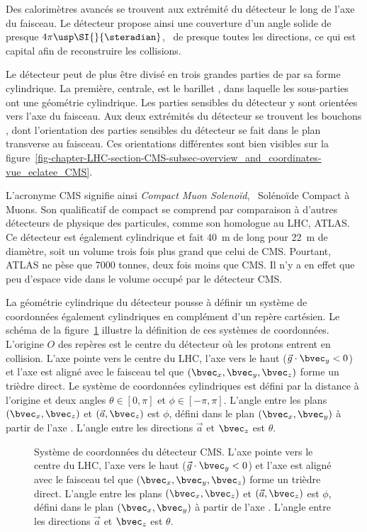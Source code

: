 Des calorimètres avancés se trouvent aux extrémité du détecteur le long de l'axe du faisceau.
Le détecteur propose ainsi une couverture d'un angle solide de presque $4\pi\usp\SI{}{\steradian}$, \ie\ de presque toutes les directions, ce qui est capital afin de reconstruire les collisions.
\par Le détecteur peut de plus être divisé en trois grandes parties de par sa forme cylindrique.
La première, centrale, est le \og barillet \fg, dans laquelle les sous-parties ont une géométrie cylindrique.
Les parties sensibles du détecteur y sont orientées vers l'axe du faisceau.
Aux deux extrémités du détecteur se trouvent les \og bouchons \fg, dont l'orientation des parties sensibles du détecteur se fait dans le plan transverse au faisceau.
Ces orientations différentes sont bien visibles sur la figure~\ref{fig-chapter-LHC-section-CMS-subsec-overview_and_coordinates-vue_eclatee_CMS}.
\par L'acronyme CMS signifie ainsi \emph{Compact Muon Solenoïd}, \ie\ Solénoïde Compact à Muons.
Son qualificatif de \og compact \fg{} se comprend par comparaison à d'autres détecteurs de physique des particules, comme son homologue au LHC, ATLAS.
Ce détecteur est également cylindrique et fait \SI{40}{\meter} de long pour \SI{22}{\meter} de diamètre, soit un volume trois fois plus grand que celui de CMS.
Pourtant, ATLAS ne pèse \og que \fg{} \num{7000} tonnes, deux fois moins que CMS.
Il n'y a en effet que peu d'espace vide dans le volume occupé par le détecteur CMS.
\par La géométrie cylindrique du détecteur pousse à définir un système de coordonnées également cylindriques en complément d'un repère cartésien.
Le schéma de la figure~\ref{fig-chapter-LHC-section-CMS-subsec-overview_and_coordinates-CMS_3D_phi_theta_defs} illustre la définition de ces systèmes de coordonnées.
L'origine $O$ des repères est le centre du détecteur où les protons entrent en collision.
L'axe  pointe vers le centre du LHC, l'axe  vers le haut ($\vec{g}\cdot\bvec_y<0$) et l'axe  est aligné avec le faisceau tel que $(\bvec_x, \bvec_y, \bvec_z)$ forme un trièdre direct.
Le système de coordonnées cylindriques est défini par la distance à l'origine et deux angles $\theta\in[0,\pi]$ et $\phi\in[-\pi,\pi]$.
L'angle entre les plans $(\bvec_x, \bvec_z)$ et $(\vec{a}, \bvec_z)$ est $\phi$, défini dans le plan $(\bvec_x,\bvec_y)$ à partir de l'axe .
L'angle entre les directions $\vec{a}$ et $\bvec_z$ est $\theta$.
\begin{figure}[h]
\centering

\caption[Système de coordonnées du détecteur CMS.]{Système de coordonnées du détecteur CMS. L'axe  pointe vers le centre du LHC, l'axe  vers le haut ($\vec{g}\cdot\bvec_y<0$) et l'axe  est aligné avec le faisceau tel que $(\bvec_x, \bvec_y, \bvec_z)$ forme un trièdre direct. L'angle entre les plans $(\bvec_x, \bvec_z)$ et $(\vec{a}, \bvec_z)$ est $\phi$, défini dans le plan $(\bvec_x,\bvec_y)$ à partir de l'axe . L'angle entre les directions $\vec{a}$ et $\bvec_z$ est $\theta$.}
\label{fig-chapter-LHC-section-CMS-subsec-overview_and_coordinates-CMS_3D_phi_theta_defs}
\end{figure}
